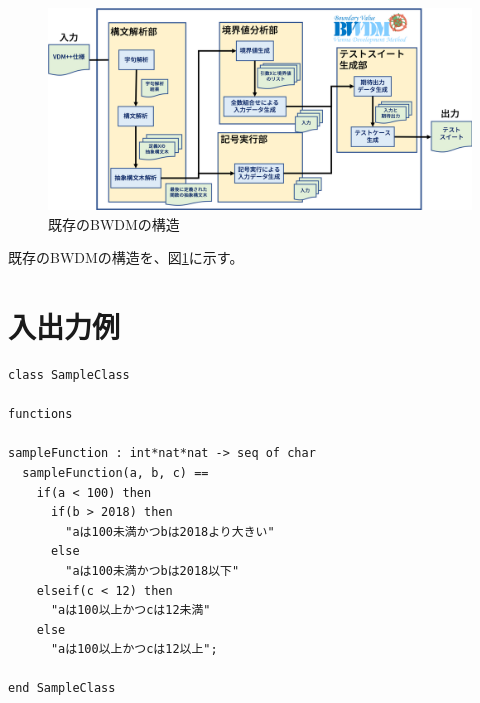 \documentclass[uplatex, report, a4j, 10pt]{jsbook}
\begin{document}
\begin{figure}[tp]
  \centering
  \includegraphics[keepaspectratio, width=160mm]{figs/exist_bwdm_structure.png}
  \caption{既存のBWDMの構造}
  \label{fig:existBwdmStructure}
\end{figure}

既存のBWDMの構造を、図\ref{fig:existBwdmStructure}に示す。

\section{入出力例}

\lstset{language=}
\noindent\begin{minipage}{\textwidth}
  \begin{lstlisting}[caption=VDM++仕様の例,label=fig:input_sample]
class SampleClass

functions

sampleFunction : int*nat*nat -> seq of char
  sampleFunction(a, b, c) == 
    if(a < 100) then
      if(b > 2018) then
        "aは100未満かつbは2018より大きい"
      else
        "aは100未満かつbは2018以下"
    elseif(c < 12) then
      "aは100以上かつcは12未満"
    else
      "aは100以上かつcは12以上";

end SampleClass

\end{lstlisting}
\end{minipage}
\end{document}
